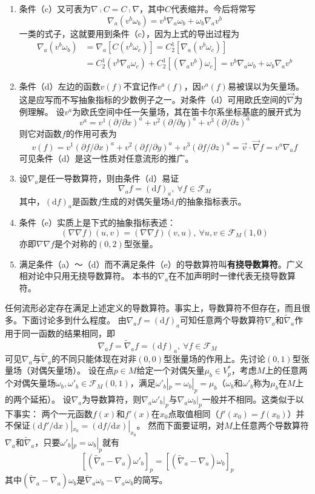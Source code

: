\begin{note}
\begin{enumerate}[（1）]
\item 条件（c）又可表为$\nabla \comp C = C \comp \nabla$，其中$C$代表缩并。今后将常写
$$\nabla_a(v^b\omega_b) = v^b\nabla_a\omega_b + \omega_b\nabla_av^b$$
一类的式子，这就要用到条件（c），因为上式的导出过程为
$$\begin{aligned}
\nabla_a(v^b\omega_b) & = \nabla_a[C(v^b\omega_c)] = C^1_2[\nabla_a(v^b\omega_c)] \\
& = C^1_2(v^b\nabla_a\omega_c) + C^1_2[(\nabla_av^b)\omega_c] = v^b\nabla_a\omega_b + \omega_b\nabla_av^b
\end{aligned}$$
\item 条件（d）左边的函数$v(f)$不宜记作$v^a(f)$，因$v^a(f)$易被误以为矢量场。
这是应写而不写抽象指标的少数例子之一。对条件（d）可用欧氏空间的$\vec{\nabla}$为例理解。
设$v^a$为欧氏空间中任一矢量场，其在笛卡尔系坐标基底的展开式为
$$v^a = v^1(\partial / \partial x)^a + v^2(\partial / \partial y)^a + v^3(\partial / \partial z)^a$$
则它对函数$f$的作用可表为
$$v(f) = v^1(\partial f / \partial x)^a + v^2(\partial f / \partial y)^a + v^3(\partial f / \partial z)^a = \vec{v}\cdot\vec{\nabla}f = v^a\nabla_af$$
可见条件（d）是这一性质对任意流形的推广。
\item 设$\nabla_a$是任一导数算符，则由条件（d）易证
$$\nabla_af = (\mathrm{d}f)_a, ~ \forall f \in \mathscr{F}_M$$
其中，$(\mathrm{d}f)_a$是函数$f$生成的对偶矢量场$\mathrm{d}f$的抽象指标表示。
\item 条件（e）实质上是下式的抽象指标表述：
$$(\nabla\nabla f)(u, v) = (\nabla\nabla f)(v, u), ~ \forall u, v \in \mathscr{F}_M(1, 0)$$
亦即$\nabla\nabla f$是个对称的$(0, 2)$型张量。
\item 满足条件（a）～（d）而不满足条件（e）的导数算符叫\textbf{有挠导数算符}。广义相对论中只用无挠导数算符。
本书的$\nabla_a$在不加声明时一律代表无挠导数算符。
\end{enumerate}
\end{note}

任何流形必定存在满足上述定义的导数算符。事实上，导数算符不但存在，而且很多。下面讨论多到什么程度。
由$\nabla_af = (\mathrm{d}f)_a$可知任意两个导数算符$\nabla_a$和$\tilde\nabla_a$作用于同一函数的结果相同，即
$$\nabla_af = \tilde\nabla_af = (\mathrm{d}f)_a, ~ \forall f \in \mathscr{F}_M$$
可见$\nabla_a$与$\tilde\nabla_a$的不同只能体现在对非$(0, 0)$型张量场的作用上。先讨论$(0, 1)$型张量场（对偶矢量场）。
设在点$p \in M$给定一个对偶矢量$\mu_b \in V_p^*$，考虑$M$上的任意两个对偶矢量场$\omega_b, \omega'_b \in \mathscr{F}_M(0, 1)$，满足$\omega'_b|_p = \omega_b|_p = \mu_b$（$\omega_b$和$\omega'_b$称为$\mu_b$在$M$上的两个延拓）。
设$\nabla_a$为导数算符，则$\nabla_a\omega'_b|_p$与$\nabla_a\omega_b|_p$一般并不相同。这类似于以下事实：
两个一元函数$f(x)$和$f'(x)$在$x_0$点取值相同（$f'(x_0) = f(x_0)$）并不保证$(\mathrm{d}f' /\mathrm{d}x)|_{x_0} = (\mathrm{d}f /\mathrm{d}x)|_{x_0}$。
然而下面要证明，对$M$上任意两个导数算符$\nabla_a$和$\tilde\nabla_a$，只要$\omega'_b|_p = \omega_b|_p$就有
$$[(\tilde\nabla_a - \nabla_a)\omega'_b]_p = [(\tilde\nabla_a - \nabla_a)\omega_b]_p$$
其中$(\tilde\nabla_a - \nabla_a)\omega_b$是$\tilde\nabla_a\omega_b - \nabla_a\omega_b$的简写。


